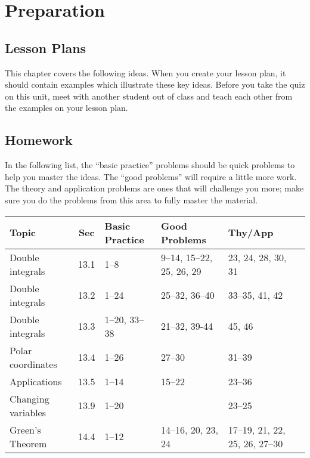 \section{Preparation}

\subsection{Lesson Plans}

This chapter covers the following ideas. When you create your lesson plan, it should contain examples which illustrate these key ideas. Before you take the quiz on this unit, meet with another student out of class and teach each other from the examples on your lesson plan. 





\subsection{Homework}

In the following list, the ``basic practice'' problems should be quick
problems to help you master the ideas.  The ``good problems'' will
require a little more work.  The theory and application problems are
ones that will challenge you more; make sure you do the problems from
this area to fully master the material.  

\smallskip 
{\noindent
\begin{tabular}{|l|c|l|l|l|l|}\hline
Topic &Sec &Basic Practice &Good Problems &Thy/App \\\hline
Double integrals & 13.1 & 1--8 & 9--14, 15--22, 25, 26, 29 & 23, 24, 28, 30, 31\\\hline
Double  integrals & 13.2 & 1--24 & 25--32, 36--40 & 33--35, 41, 42\\\hline
Double integrals & 13.3 & 1--20, 33--38 & 21--32, 39-44 & 45, 46\\\hline
Polar coordinates & 13.4 & 1--26 & 27--30 & 31--39\\\hline
Applications & 13.5 & 1--14 & 15--22 & 23--36\\\hline
Changing variables & 13.9 & 1--20 & & 23--25\\\hline
Green's Theorem & 14.4 & 1--12 & 14--16, 20, 23, 24 & 17--19, 21, 22, 25, 26, 27--30\\\hline
\end{tabular}
} 
\medskip

